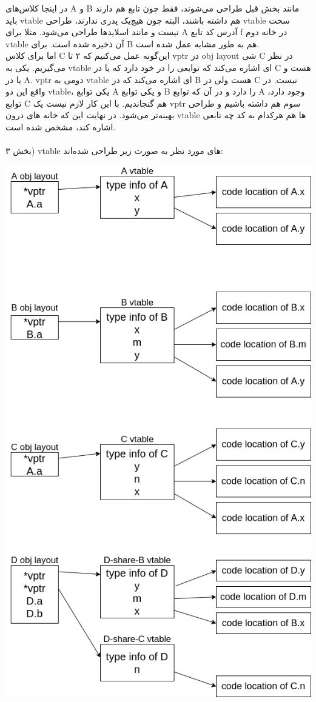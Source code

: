 در اینجا کلاس‌های A و B مانند بخش قبل طراحی می‌شوند، فقط چون تابع هم دارند باید vtable هم داشته باشند، البته چون هیچ‌یک پدری ندارند، طراحی vtable سخت نیست و مانند اسلایدها طراحی می‌شود. مثلا برای A آدرس کد تابع f در خانه دوم vtable آن ذخیره شده است. برای B هم به طور مشابه عمل شده است.
\\
اما برای کلاس C این‌گونه عمل می‌کنیم که ۲ تا vptr در obj layout شی C در نظر می‌گیریم. یکی به vtable ای اشاره می‌کند که توابعی را در خود دارد که یا در C هست و یا در A. 
vptr 
دومی به vtable ای اشاره می‌کند که در B هست ولی در C نیست. در واقع این دو vtable، یکی توابع A و یکی توابع B را دارد و در آن که توابع A وجود دارد، توابع C هم گنجاندیم. با این کار لازم نیست یک vptr سوم هم داشته باشیم و طراحی بهینه‌تر می‌شود. در نهایت این که خانه های درون vtable ها هم هرکدام به کد چه تابعی اشاره کند، مشخص شده است.
\\
\\
بخش ۳) vtable های مورد نظر به صورت زیر طراحی شده‌اند:
\begin{center}
	\includegraphics[scale=0.7]{q2_3.png}
\end{center}
